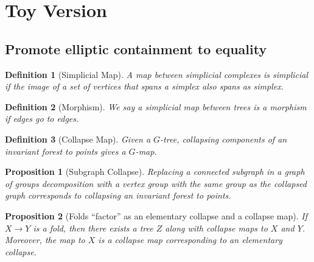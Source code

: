 \documentclass{article}
\theoremstyle{mystyle}
\newtheorem{pro}{Proposition}
\newtheorem{defn}{Definition}
\theoremstyle{remark}
\begin{document}
\tableofcontents

\section{Toy Version}
\subsection{Promote elliptic containment to equality}

\begin{defn}
    [Simplicial Map]
    A map between simplicial complexes is simplicial if the image of a set of vertices that spans a simplex also spans as simplex.
\end{defn}

\begin{defn}
    [Morphism]
    We say a simplicial map between trees is a morphism if edges go to edges.
\end{defn}

\begin{defn}
    [Collapse Map]
    Given a \(G\)-tree, collapsing components of an invariant forest to points gives a \(G\)-map.
\end{defn}
\begin{pro}
    [Subgraph Collapse]
    Replacing a connected subgraph in a graph of groups decomposition with a vertex group with the same group as the collapsed graph corresponds to collapsing an invariant forest to points.
\end{pro}

\begin{pro}
    [Folds ``factor'' as an elementary collapse and a collapse map]
    \label{pro:foldfactor} 
    If \(X \to Y\) is a fold, then there exists a tree \(Z\) along with collapse maps to \(X\) and
\(Y\). Moreover, the map to \(X\) is a collapse map corresponding to an elementary collapse.
\end{pro}
\end{document}
